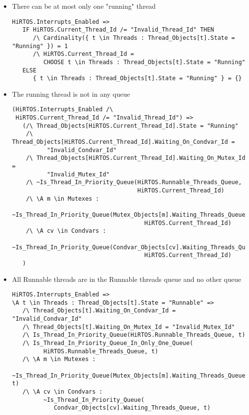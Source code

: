 \documentclass[11pt,letterpaper,twoside,openany]{book}
\begin{document}
\begin{itemize}
\item There can be at most only one "running" thread

\begin{lstlisting}
HiRTOS.Interrupts_Enabled =>
   IF HiRTOS.Current_Thread_Id /= "Invalid_Thread_Id" THEN
      /\ Cardinality({ t \in Threads : Thread_Objects[t].State = "Running" }) = 1
      /\ HiRTOS.Current_Thread_Id =
         CHOOSE t \in Threads : Thread_Objects[t].State = "Running"
   ELSE
      { t \in Threads : Thread_Objects[t].State = "Running" } = {}
\end{lstlisting}

\item The running thread is not in any queue
\begin{lstlisting}
(HiRTOS.Interrupts_Enabled /\
 HiRTOS.Current_Thread_Id /= "Invalid_Thread_Id") =>
   (/\ Thread_Objects[HiRTOS.Current_Thread_Id].State = "Running"
    /\ Thread_Objects[HiRTOS.Current_Thread_Id].Waiting_On_Condvar_Id =
          "Invalid_Condvar_Id"
    /\ Thread_Objects[HiRTOS.Current_Thread_Id].Waiting_On_Mutex_Id =
          "Invalid_Mutex_Id"
    /\ ~Is_Thread_In_Priority_Queue(HiRTOS.Runnable_Threads_Queue,
                                    HiRTOS.Current_Thread_Id)
    /\ \A m \in Mutexes :
         ~Is_Thread_In_Priority_Queue(Mutex_Objects[m].Waiting_Threads_Queue,
                                      HiRTOS.Current_Thread_Id)
    /\ \A cv \in Condvars :
         ~Is_Thread_In_Priority_Queue(Condvar_Objects[cv].Waiting_Threads_Queue,
                                      HiRTOS.Current_Thread_Id)
   )
\end{lstlisting}

\item All Runnable threads are in the Runnable threads queue and no other queue
\begin{lstlisting}
HiRTOS.Interrupts_Enabled =>
\A t \in Threads : Thread_Objects[t].State = "Runnable" =>
   /\ Thread_Objects[t].Waiting_On_Condvar_Id = "Invalid_Condvar_Id"
   /\ Thread_Objects[t].Waiting_On_Mutex_Id = "Invalid_Mutex_Id"
   /\ Is_Thread_In_Priority_Queue(HiRTOS.Runnable_Threads_Queue, t)
   /\ Is_Thread_In_Priority_Queue_In_Only_One_Queue(
         HiRTOS.Runnable_Threads_Queue, t)
   /\ \A m \in Mutexes :
         ~Is_Thread_In_Priority_Queue(Mutex_Objects[m].Waiting_Threads_Queue, t)
   /\ \A cv \in Condvars :
         ~Is_Thread_In_Priority_Queue(
            Condvar_Objects[cv].Waiting_Threads_Queue, t)
\end{lstlisting}


\end{itemize}
\end{document}
